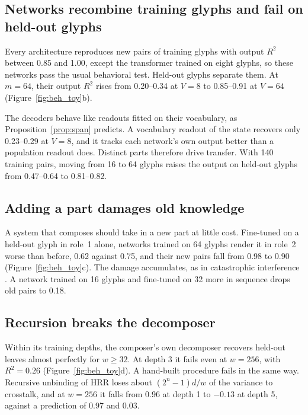 \documentclass[10pt]{article}
\theoremstyle{plain}
\theoremstyle{remark}
\begin{document}
\subsection{Networks recombine training glyphs and fail on held-out glyphs}
\label{sec:networks}

Every architecture reproduces new pairs of training glyphs with output $R^2$ between 0.85 and 1.00, except the transformer trained on eight glyphs, so these networks pass the usual behavioral test. Held-out glyphs separate them. At $m = 64$, their output $R^2$ rises from 0.20--0.34 at $V = 8$ to 0.85--0.91 at $V = 64$ (Figure~\ref{fig:beh_toy}b).

The decoders behave like readouts fitted on their vocabulary, as Proposition~\ref{prop:span} predicts. A vocabulary readout of the state recovers only 0.23--0.29 at $V = 8$, and it tracks each network's own output better than a population readout does. Distinct parts therefore drive transfer. With 140 training pairs, moving from 16 to 64 glyphs raises the output on held-out glyphs from 0.47--0.64 to 0.81--0.82.

\subsection{Adding a part damages old knowledge}
\label{sec:adding}

A system that composes should take in a new part at little cost. Fine-tuned on a held-out glyph in role~1 alone, networks trained on 64 glyphs render it in role~2 worse than before, 0.62 against 0.75, and their new pairs fall from 0.98 to 0.90 (Figure~\ref{fig:beh_toy}c). The damage accumulates, as in catastrophic interference \citep{mccloskey1989}. A network trained on 16 glyphs and fine-tuned on 32 more in sequence drops old pairs to 0.18.

\subsection{Recursion breaks the decomposer}
\label{sec:depth}

Within its training depths, the composer's own decomposer recovers held-out leaves almost perfectly for $w \ge 32$. At depth 3 it fails even at $w = 256$, with $R^2 = 0.26$ (Figure~\ref{fig:beh_toy}d). A hand-built procedure fails in the same way. Recursive unbinding of HRR loses about $(2^n - 1)d/w$ of the variance to crosstalk, and at $w = 256$ it falls from 0.96 at depth 1 to $-0.13$ at depth 5, against a prediction of 0.97 and 0.03.
\end{document}

